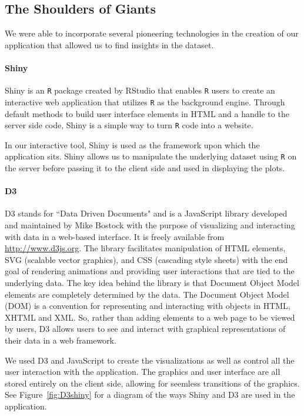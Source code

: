\documentclass[11pt]{article}\usepackage{knitr}
\begin{document}
\subsection*{The Shoulders of Giants}
We were able to incorporate several pioneering technologies in the creation of our application that allowed us to find insights in the dataset.

\paragraph{Shiny}
Shiny \cite{rs-shiny} is an {\tt R} package created by RStudio that enables {\tt R} users to create an interactive web application that utilizes {\tt R} as the background engine. Through default methods to build user interface elements in HTML and a handle to the server side code, Shiny is a simple way to turn {\tt R} code into a website. 

In our interactive tool, Shiny is used as the framework upon which the application sits. Shiny allows us to manipulate the underlying dataset using {\tt R} on the server before passing it to the client side and used in displaying the plots.

\paragraph{D3}
D3 \cite{mb-d3} stands for ``Data Driven Documents" and is a JavaScript library developed and maintained by Mike Bostock with the  purpose of visualizing and interacting with data in a web-based interface. It is freely available from \url{http://www.d3js.org}. The library facilitates manipulation of HTML elements, SVG (scalable vector graphics), and CSS (cascading style sheets) with the end goal of rendering animations and providing user interactions that are tied to the underlying data. The key idea behind the library is that Document Object Model elements are completely determined by the data. The Document Object Model (DOM) is a convention for representing and interacting with objects in HTML, XHTML and XML. So, rather than adding elements to a web page to be viewed by users, D3 allows users to see and interact with graphical representations of their data in a web framework. 

We used D3 and JavaScript to create the visualizations as well as control all the user interaction with the application. The graphics and user interface are all stored entirely on the client side, allowing for seemless transitions of the graphics. See Figure~\ref{fig:D3shiny} for a diagram of the ways Shiny and D3 are used in the application.
\end{document}

